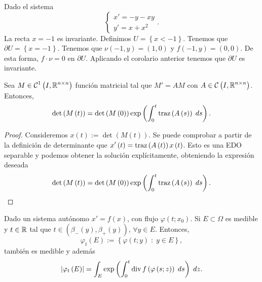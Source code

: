 \begin{eg}[Problema 44]
Dado el sistema
\[
\begin{cases}
x' = -y-xy \\
y' = x + x^{2}
\end{cases}
.\]
La recta $\displaystyle x = - 1 $ es invariante. Definimos $\displaystyle U = \left\{ x < - 1\right\}  $. Tenemos que $\displaystyle \partial U = \left\{ x = - 1\right\}  $. Tenemos que $\displaystyle \nu\left(-1,y\right)=\left(1,0\right) $ y $\displaystyle f\left(-1,y\right)=\left(0,0\right) $. De esta forma, $\displaystyle f \cdot \nu = 0 $ en $\displaystyle \partial U $. Aplicando el corolario anterior tenemos que $\displaystyle \partial U $ es invariante. 
\end{eg}
\begin{prop}
Sea $\displaystyle M \in \mathcal{C}^{1}\left(I, \mathbb{R}^{n \times n}\right) $ función matricial tal que $\displaystyle M' = AM $ con $\displaystyle A \in \mathcal{C}\left(I, \mathbb{R}^{n \times n}\right) $. Entonces, 
\[\det\left(M\left(t\right)\right)=\det\left(M\left(0\right)\right)\exp\left(\int^{t}_{0} \operatorname{traz}\left(A\left(s\right)\right) \; d s\right) .\]
\end{prop}
\begin{proof}
Consideremos $\displaystyle x\left(t\right):=\det\left(M\left(t\right)\right) $. Se puede comprobar a partir de la definición de determinante que $\displaystyle x'\left(t\right)=\operatorname{traz}\left(A\left(t\right)\right)x\left(t\right) $. Esto es una EDO separable y podemos obtener la solución explícitamente, obteniendo la expresión deseada
\[\det\left(M\left(t\right)\right)=\det\left(M\left(0\right)\right)\exp\left(\int^{t}_{0} \operatorname{traz}\left(A\left(s\right)\right) \; d s \right) .\]	
\end{proof}
\begin{theorem}
Dado un sistema autónomo $\displaystyle x' = f\left(x\right) $, con flujo $\displaystyle \varphi\left(t; x_{0}\right) $. Si $\displaystyle E \subset \Omega  $ es medible y $\displaystyle t \in \mathbb{R} $ tal que $\displaystyle t \in \left(\beta_{-}\left(y\right), \beta_{+ }\left(y\right)\right) $, $\displaystyle \forall y \in E $. 
Entonces, 
\[\varphi_{t}\left(E\right):= \left\{ \varphi\left(t; y\right) \; : \; y \in E\right\}  ,\]
también es medible y además
\[ \left|\varphi_{t}\left(E\right)\right|=\int _{E}\exp\left(\int^{t}_{0} \operatorname{div} f\left(\varphi\left(s; z\right)\right) \; d s\right) \; dz .\]
\end{theorem}
